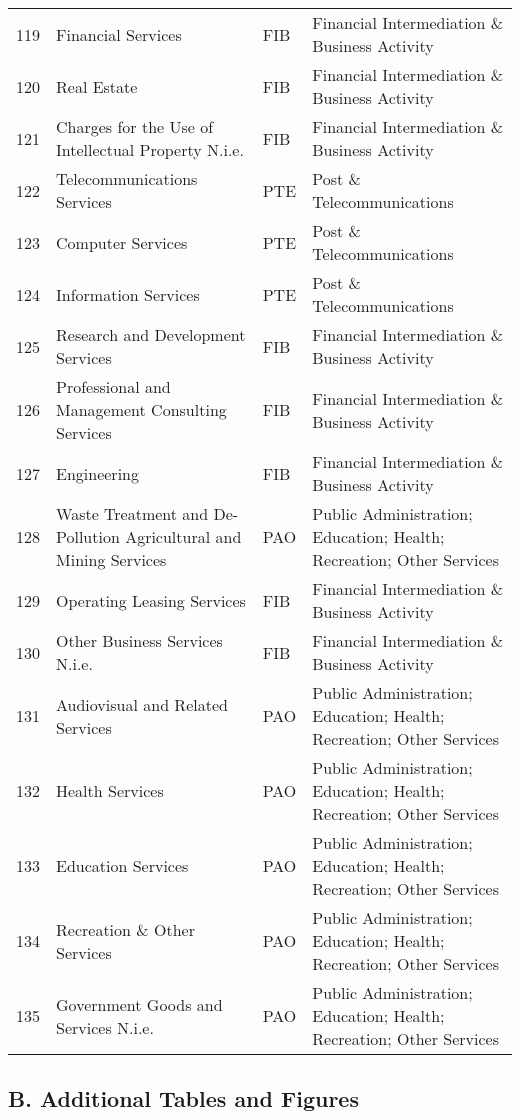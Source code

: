 \documentclass[a4paper]{article}
\begin{document}
\begin{table}[ht]
{\begin{tabular}{rlll}
  119 & Financial Services & FIB & Financial Intermediation \& Business Activity \\ 
  120 & Real Estate & FIB & Financial Intermediation \& Business Activity \\ 
  121 & Charges for the Use of Intellectual Property N.i.e. & FIB & Financial Intermediation \& Business Activity \\ 
  122 & Telecommunications Services & PTE & Post \& Telecommunications \\ 
  123 & Computer Services & PTE & Post \& Telecommunications \\ 
  124 & Information Services & PTE & Post \& Telecommunications \\ 
  125 & Research and Development Services & FIB & Financial Intermediation \& Business Activity \\ 
  126 & Professional and Management Consulting Services & FIB & Financial Intermediation \& Business Activity \\ 
  127 & Engineering & FIB & Financial Intermediation \& Business Activity \\ 
  128 & Waste Treatment and De-Pollution Agricultural and Mining Services & PAO & Public Administration; Education; Health; Recreation; Other Services \\ 
  129 & Operating Leasing Services & FIB & Financial Intermediation \& Business Activity \\ 
  130 & Other Business Services N.i.e. & FIB & Financial Intermediation \& Business Activity \\ 
  131 & Audiovisual and Related Services & PAO & Public Administration; Education; Health; Recreation; Other Services \\ 
  132 & Health Services & PAO & Public Administration; Education; Health; Recreation; Other Services \\ 
  133 & Education Services & PAO & Public Administration; Education; Health; Recreation; Other Services \\ 
  134 & Recreation \& Other Services & PAO & Public Administration; Education; Health; Recreation; Other Services \\ 
  135 & Government Goods and Services N.i.e. & PAO & Public Administration; Education; Health; Recreation; Other Services \\ 
   \bottomrule
\end{tabular}
}
\end{table}
\FloatBarrier

\subsection*{B. Additional Tables and Figures}
\setcounter{table}{0}
\renewcommand{\thetable}{B\arabic{table}}
\setcounter{figure}{0}
\renewcommand{\thefigure}{B\arabic{figure}}
\end{document}
